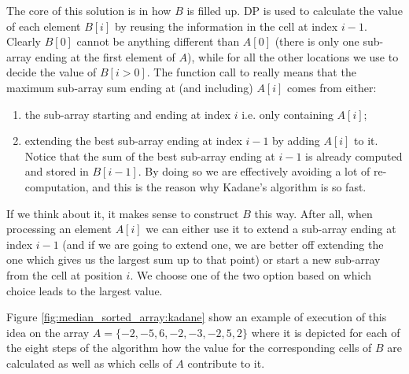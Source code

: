 

The core of this solution is in how $B$ is filled up. DP is used to calculate the value of each element $B[i]$ by reusing the information in the cell at index $i-1$. Clearly $B[0]$ cannot be anything different than $A[0]$ (there is only one sub-array ending at the first element of $A$), while for all the other locations we use  to decide the value of $B[i > 0 ]$. 
The function call to  really means that the maximum sub-array sum ending at (and including) $A[i]$ comes from either:

\begin{enumerate}
	\item the sub-array starting and ending at index $i$ i.e. only containing $A[i]$;
	\item extending the best sub-array ending at index $i-1$ by adding $A[i]$ to it. Notice that the sum of the
	best sub-array ending at $i-1$ is already computed and stored in $B[i-1]$. By doing so we are
	effectively avoiding a lot of re-computation, and this is the reason why Kadane's algorithm is
	so fast.
\end{enumerate}
If we think about it, it makes sense to construct $B$ this way. After all, when processing an element $A[i]$ we can either use it to extend a sub-array ending at index $i-1$ (and if we are going to extend one, we are better off extending the one which gives us the largest sum up to that point) or start a new sub-array from the cell at position $i$. We choose one of the two option based on which choice leads to the largest value. 

Figure \ref{fig:median_sorted_array:kadane} show an example of execution of this idea on the array $A=\{-2,-5,6,-2,-3,-2,5,2\}$ where it is depicted for each of the eight steps of the algorithm how the value for the corresponding cells of $B$ are calculated as well as which cells of $A$ contribute to it.

